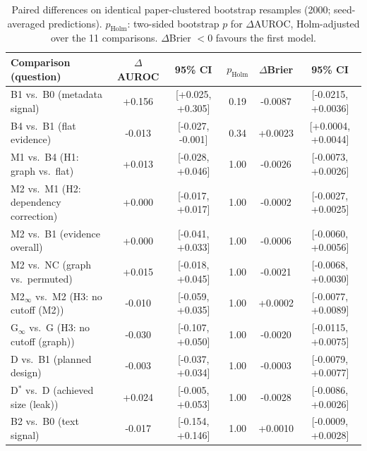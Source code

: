 \begin{table}[t]\centering\caption{Paired differences on identical paper-clustered bootstrap resamples (2000; seed-averaged predictions). $p_{\mathrm{Holm}}$: two-sided bootstrap $p$ for $\Delta$AUROC, Holm-adjusted over the 11 comparisons. $\Delta$Brier $<0$ favours the first model.}\label{tab:delta}
\footnotesize\setlength{\tabcolsep}{6pt}\begin{tabular}{@{}lccccc@{}}\toprule
Comparison (question) & $\Delta$AUROC & 95\% CI & $p_{\mathrm{Holm}}$ & $\Delta$Brier & 95\% CI \\\midrule
B1 vs.\ B0 (metadata signal) & +0.156 & [+0.025, +0.305] & 0.19 & -0.0087 & [-0.0215, +0.0036] \\
B4 vs.\ B1 (flat evidence) & -0.013 & [-0.027, -0.001] & 0.34 & +0.0023 & [+0.0004, +0.0044] \\
M1 vs.\ B4 (H1: graph vs.\ flat) & +0.013 & [-0.028, +0.046] & 1.00 & -0.0026 & [-0.0073, +0.0026] \\
M2 vs.\ M1 (H2: dependency correction) & +0.000 & [-0.017, +0.017] & 1.00 & -0.0002 & [-0.0027, +0.0025] \\
M2 vs.\ B1 (evidence overall) & +0.000 & [-0.041, +0.033] & 1.00 & -0.0006 & [-0.0060, +0.0056] \\
M2 vs.\ NC (graph vs.\ permuted) & +0.015 & [-0.018, +0.045] & 1.00 & -0.0021 & [-0.0068, +0.0030] \\
M2$_\infty$ vs.\ M2 (H3: no cutoff (M2)) & -0.010 & [-0.059, +0.035] & 1.00 & +0.0002 & [-0.0077, +0.0089] \\
G$_\infty$ vs.\ G (H3: no cutoff (graph)) & -0.030 & [-0.107, +0.050] & 1.00 & -0.0020 & [-0.0115, +0.0075] \\
D vs.\ B1 (planned design) & -0.003 & [-0.037, +0.034] & 1.00 & -0.0003 & [-0.0079, +0.0077] \\
D$^{*}$ vs.\ D (achieved size (leak)) & +0.024 & [-0.005, +0.053] & 1.00 & -0.0028 & [-0.0086, +0.0026] \\
B2 vs.\ B0 (text signal) & -0.017 & [-0.154, +0.146] & 1.00 & +0.0010 & [-0.0009, +0.0028] \\
\bottomrule\end{tabular}\end{table}
